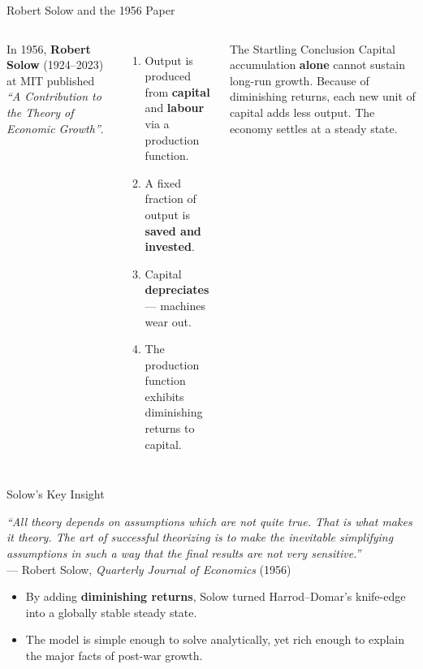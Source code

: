 \documentclass[aspectratio=169, 10pt]{beamer}
\begin{document}
\begin{frame}{Robert Solow and the 1956 Paper}
\begin{columns}[T]
In 1956, \textbf{Robert Solow} (1924--2023) at MIT published
\textit{``A Contribution to the Theory of Economic Growth''}.
\vspace{0.5em}
\begin{enumerate}
  \item Output is produced from \textbf{capital} and \textbf{labour}
        via a production function.
  \item A fixed fraction of output is \textbf{saved and invested}.
  \item Capital \textbf{depreciates} --- machines wear out.
  \item The production function exhibits \alert{diminishing returns}
        to capital.
\end{enumerate}
\begin{block}{The Startling Conclusion}
Capital accumulation \textbf{alone} cannot sustain long-run growth.
Because of diminishing returns, each new unit of capital adds less
output. The economy settles at a \alert{steady state}.
\end{block}
\end{columns}
\end{frame}

\begin{frame}{Solow's Key Insight}
\begin{center}
\textit{``All theory depends on assumptions which are not quite true.
That is what makes it theory. The art of successful theorizing is to
make the inevitable simplifying assumptions in such a way that the
final results are not very sensitive.''}\\[6pt]
--- Robert Solow, \textit{Quarterly Journal of Economics} (1956)
\end{center}
\vspace{1em}
\begin{itemize}
  \item By adding \textbf{diminishing returns}, Solow turned Harrod--Domar's
        knife-edge into a \alert{globally stable} steady state.
  \item The model is simple enough to solve analytically, yet rich enough
        to explain the major facts of post-war growth.
\end{itemize}
\end{frame}
\end{document}
